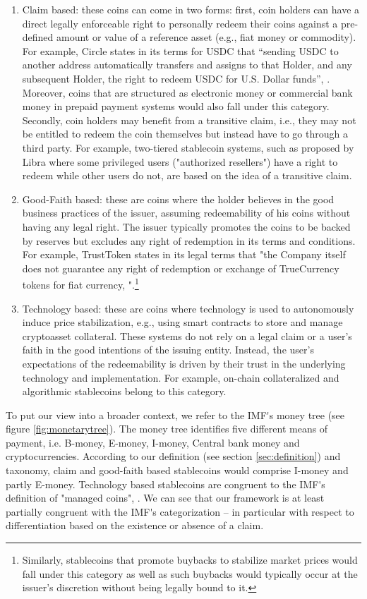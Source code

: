 \documentclass[conference]{IEEEtran}
\begin{document}
\begin{enumerate}
	\item Claim based: these coins can come in two forms: first, coin holders can have a direct legally enforceable right to personally redeem their coins against a pre-defined amount or value of a reference asset (e.g., fiat money or commodity). For example, Circle states in its terms for USDC that ``sending USDC to another address automatically transfers and assigns to that Holder, and any subsequent Holder, the right to redeem USDC for U.S. Dollar funds'', \cite{Circle}. Moreover, coins that are structured as electronic money or commercial bank money in prepaid payment systems would also fall under this category. Secondly, coin holders may benefit from a transitive claim, i.e., they may not be entitled to redeem the coin themselves but instead have to go through a third party. For example, two-tiered stablecoin systems, such as proposed by Libra where some privileged users ("authorized resellers") have a right to redeem while other users do not, are based on the idea of a transitive claim.
	\item Good-Faith based:  these are coins where the holder believes in the good business practices of the issuer, assuming redeemability of his coins without having any legal right. The issuer typically promotes the coins to be backed by reserves but excludes any right of redemption in its terms and conditions. For example, TrustToken states in its legal terms that "the Company itself does not guarantee any right of redemption or exchange of TrueCurrency tokens for fiat currency, "\cite{TrustToken}.\footnote{Similarly, stablecoins that promote buybacks to stabilize market prices would fall under this category as well as such buybacks would typically occur at the issuer's discretion without being legally bound to it.}\item Technology based: these are coins where technology is used to autonomously induce price stabilization, e.g., using smart contracts to store and manage cryptoasset collateral. These systems do not rely on a legal claim or a user's faith in the good intentions of the issuing entity. Instead, the user's expectations of the redeemability is driven by their trust in the underlying technology and implementation. For example, on-chain collateralized and algorithmic stablecoins belong to this category.
\end{enumerate}

To put our view into a broader context, we refer to the \ac{IMF's} money tree (see figure \ref{fig:monetarytree}). The money tree identifies five different means of payment, i.e. B-money, E-money, I-money, Central bank money and cryptocurrencies. According to our definition (see section \ref{sec:definition}) and taxonomy, claim and good-faith based stablecoins would comprise I-money and partly E-money. Technology based stablecoins are congruent to the \ac{IMF's} definition of "managed coins", \cite{IMF}. We can see that our framework is at least partially congruent with the \ac{IMF's} categorization -- in particular with respect to differentiation based on the existence or absence of a claim. 
\end{document}
